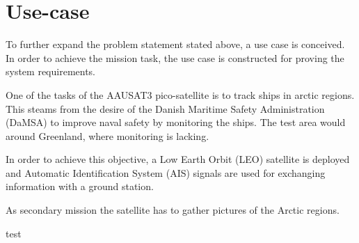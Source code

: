 \section{Use-case}\label{sec:useCase}
To further expand the problem statement stated above, a use case is conceived. In order to achieve the mission task, the use case is constructed for proving the system requirements.

One of the tasks of the AAUSAT3 pico-satellite is to track ships in arctic regions. This steams from the desire of the Danish Maritime Safety Administration (DaMSA) to improve naval safety by monitoring the ships. The test area would around Greenland, where monitoring is lacking. %

In order to achieve this objective, a Low Earth Orbit  (LEO)  satellite is deployed and Automatic Identification System (AIS) signals are used for exchanging information with a ground station.

As secondary mission the satellite has to gather pictures of the Arctic regions.

test
